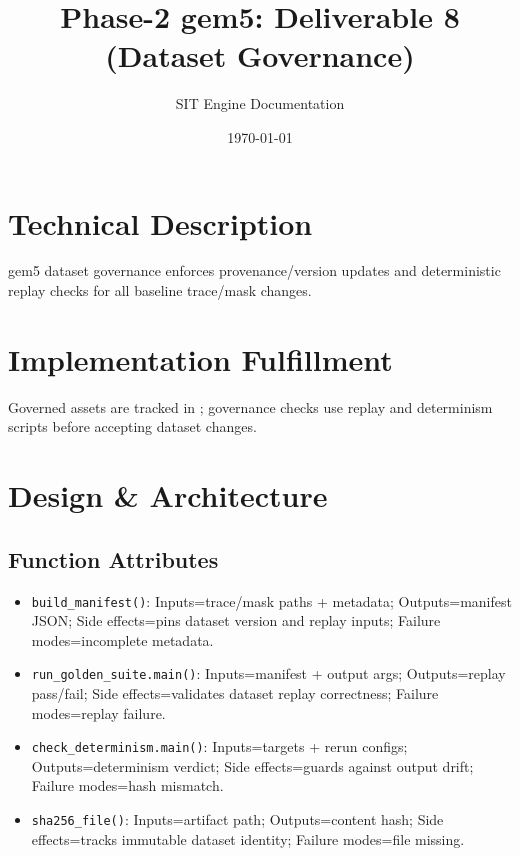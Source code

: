 \documentclass[11pt,a4paper]{article}
\title{Phase-2 gem5: Deliverable 8 (Dataset Governance)}
\author{SIT Engine Documentation}
\date{\today}
\newcommand{\codepath}[1]{\path{#1}}
\begin{document}
\maketitle

\section{Technical Description}
gem5 dataset governance enforces provenance/version updates and deterministic replay checks for all baseline trace/mask changes.

\section{Implementation Fulfillment}
Governed assets are tracked in \codepath{Phase-2/datasets/}; governance checks use replay and determinism scripts before accepting dataset changes.

\section{Design \& Architecture}
\subsection*{Function Attributes}
\begin{itemize}[leftmargin=*]
  \item \texttt{build\_manifest()}: Inputs=trace/mask paths + metadata; Outputs=manifest JSON; Side effects=pins dataset version and replay inputs; Failure modes=incomplete metadata.
  \item \texttt{run\_golden\_suite.main()}: Inputs=manifest + output args; Outputs=replay pass/fail; Side effects=validates dataset replay correctness; Failure modes=replay failure.
  \item \texttt{check\_determinism.main()}: Inputs=targets + rerun configs; Outputs=determinism verdict; Side effects=guards against output drift; Failure modes=hash mismatch.
  \item \texttt{sha256\_file()}: Inputs=artifact path; Outputs=content hash; Side effects=tracks immutable dataset identity; Failure modes=file missing.
\end{itemize}
\end{document}
